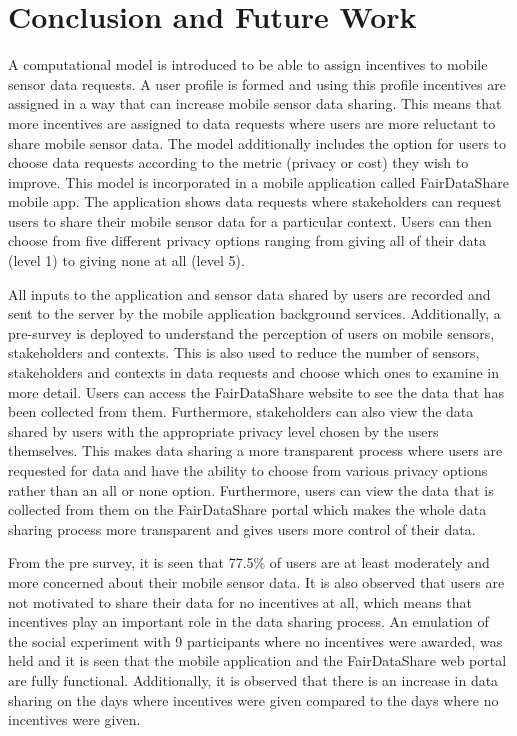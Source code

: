 \chapter{Conclusion and Future Work}

A computational model is introduced to be able to assign incentives to mobile sensor data requests. A user profile is formed and using this profile incentives are assigned in a way that can increase mobile sensor data sharing. This means that more incentives are assigned to data requests where users are more reluctant to share mobile sensor data. The model additionally includes the option for users to choose data requests according to the metric (privacy or cost) they wish to improve. This model is incorporated in a mobile application called FairDataShare mobile app. The application shows data requests where stakeholders can request users to share their mobile sensor data for a particular context. Users can then choose from five different privacy options ranging from giving all of their data (level 1) to giving none at all (level 5). 

All inputs to the application and sensor data shared by users are recorded and sent to the server by the mobile application background services. Additionally, a pre-survey is deployed to understand the perception of users on mobile sensors, stakeholders and contexts. This is also used to reduce the number of sensors, stakeholders and contexts in data requests and choose which ones to examine in more detail. Users can access the FairDataShare website to see the data that has been collected from them. Furthermore, stakeholders can also view the data shared by users with the appropriate privacy level chosen by the users themselves. This makes data sharing a more transparent process where users are requested for data and have the ability to choose from various privacy options rather than an all or none option. Furthermore, users can view the data that is collected from them on the FairDataShare portal which makes the whole data sharing process more transparent and gives users more control of their data.

From the pre survey, it is seen that 77.5\% of users are at least moderately and more concerned about their mobile sensor data. It is also observed that users are not motivated to share their data for no incentives at all, which means that incentives play an important role in the data sharing process. An emulation of the social experiment with 9 participants where no incentives were awarded, was held and it is seen that the mobile application and the FairDataShare web portal are fully functional. Additionally, it is observed that there is an increase in data sharing on the days where incentives were given compared to the days where no incentives were given. 

